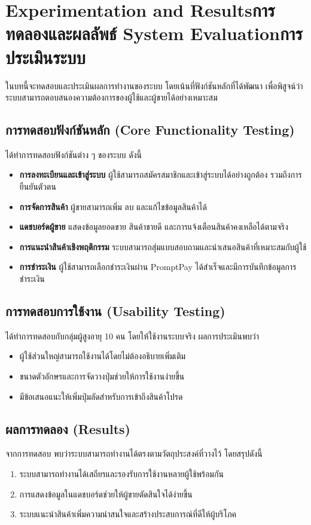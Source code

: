 \chapter{\ifproject%
\ifenglish Experimentation and Results\else การทดลองและผลลัพธ์\fi
\else%
\ifenglish System Evaluation\else การประเมินระบบ\fi
\fi}

ในบทนี้จะทดสอบและประเมินผลการทำงานของระบบ โดยเน้นที่ฟังก์ชันหลักที่ได้พัฒนา 
เพื่อพิสูจน์ว่าระบบสามารถตอบสนองความต้องการของผู้ใช้และผู้ขายได้อย่างเหมาะสม \cite{pressman2014}

\section{การทดสอบฟังก์ชันหลัก (Core Functionality Testing)}
ได้ทำการทดสอบฟังก์ชันต่าง ๆ ของระบบ ดังนี้ \cite{ecommerce2019}
\begin{itemize}
  \item \textbf{การลงทะเบียนและเข้าสู่ระบบ}  
  ผู้ใช้สามารถสมัครสมาชิกและเข้าสู่ระบบได้อย่างถูกต้อง รวมถึงการยืนยันตัวตน
  \item \textbf{การจัดการสินค้า}  
  ผู้ขายสามารถเพิ่ม ลบ และแก้ไขข้อมูลสินค้าได้
  \item \textbf{แดชบอร์ดผู้ขาย}  
  แสดงข้อมูลยอดขาย สินค้าขายดี และการแจ้งเตือนสินค้าคงเหลือได้ตามจริง
  \item \textbf{การแนะนำสินค้าเชิงพฤติกรรม}  
  ระบบสามารถสุ่มแบบสอบถามและนำเสนอสินค้าที่เหมาะสมกับผู้ใช้
  \item \textbf{การชำระเงิน}  
  ผู้ใช้สามารถเลือกชำระเงินผ่าน PromptPay ได้สำเร็จและมีการบันทึกข้อมูลการชำระเงิน
\end{itemize}

\section{การทดสอบการใช้งาน (Usability Testing)}
ได้ทำการทดสอบกับกลุ่มผู้สูงอายุ 10 คน โดยให้ใช้งานระบบจริง \cite{otop2020}
ผลการประเมินพบว่า
\begin{itemize}
  \item ผู้ใช้ส่วนใหญ่สามารถใช้งานได้โดยไม่ต้องอธิบายเพิ่มเติม
  \item ขนาดตัวอักษรและการจัดวางปุ่มช่วยให้การใช้งานง่ายขึ้น
  \item มีข้อเสนอแนะให้เพิ่มปุ่มลัดสำหรับการเข้าถึงสินค้าโปรด
\end{itemize}

\section{ผลการทดลอง (Results)}
จากการทดสอบ พบว่าระบบสามารถทำงานได้ตรงตามวัตถุประสงค์ที่วางไว้ โดยสรุปดังนี้ \cite{pressman2014}
\begin{enumerate}
  \item ระบบสามารถทำงานได้เสถียรและรองรับการใช้งานหลายผู้ใช้พร้อมกัน
  \item การแสดงข้อมูลในแดชบอร์ดช่วยให้ผู้ขายตัดสินใจได้ง่ายขึ้น
  \item ระบบแนะนำสินค้าเพิ่มความน่าสนใจและสร้างประสบการณ์ที่ดีให้ผู้บริโภค
\end{enumerate}

